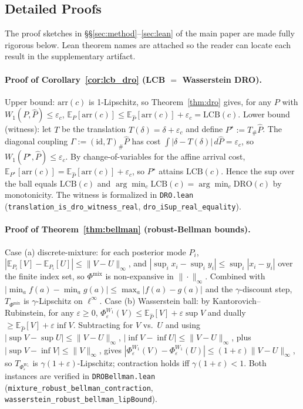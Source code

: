 \documentclass[opre,dblanonrev]{informs4}
\begin{document}
\begin{APPENDICES}
\section{Detailed Proofs}
\label{ec:detailed_proofs}

The proof sketches in \S\S\ref{sec:method}--\ref{sec:lean} of the
main paper are made fully rigorous below. Lean theorem names are
attached so the reader can locate each result in the supplementary
artifact.

\paragraph{Proof of Corollary~\ref{cor:lcb_dro} (LCB $=$ Wasserstein DRO).}
Upper bound: $\mathrm{arr}(c)$ is 1-Lipschitz, so
Theorem~\ref{thm:dro} gives, for any $P$ with
$W_1(P,\hat P)\leq\varepsilon_c$,
$\mathbb{E}_P[\mathrm{arr}(c)]\leq\mathbb{E}_{\hat P}[\mathrm{arr}(c)]
+\varepsilon_c=\mathrm{LCB}(c)$. Lower bound (witness): let $T$ be
the translation $T(\delta)=\delta+\varepsilon_c$ and define
$P^\star := T_\#\hat P$. The diagonal coupling
$\Gamma:=(\mathrm{id},T)_\#\hat P$ has cost
$\int|\delta-T(\delta)|\,d\hat P=\varepsilon_c$, so
$W_1(P^\star,\hat P)\leq\varepsilon_c$. By change-of-variables for
the affine arrival cost,
$\mathbb{E}_{P^\star}[\mathrm{arr}(c)]=\mathbb{E}_{\hat P}
[\mathrm{arr}(c)]+\varepsilon_c$, so $P^\star$ attains
$\mathrm{LCB}(c)$. Hence the sup over the ball equals
$\mathrm{LCB}(c)$ and $\arg\min_c\mathrm{LCB}(c)
=\arg\min_c\mathrm{DRO}(c)$ by monotonicity. The witness is
formalized in \texttt{DRO.lean}
(\texttt{translation\_is\_dro\_witness\_real},
\texttt{dro\_iSup\_real\_equality}).

\paragraph{Proof of Theorem~\ref{thm:bellman} (robust-Bellman bounds).}
Case (a) discrete-mixture: for each posterior mode $P_i$,
$|\mathbb{E}_{P_i}[V]-\mathbb{E}_{P_i}[U]|\leq\|V-U\|_\infty$, and
$|\sup_i x_i-\sup_i y_i|\leq\sup_i|x_i-y_i|$ over the finite index
set, so $\Phi^{\mathrm{mix}}$ is non-expansive in
$\|\cdot\|_\infty$. Combined with
$|\min_a f(a)-\min_a g(a)|\leq\max_a|f(a)-g(a)|$ and the
$\gamma$-discount step, $T_{\Phi^{\mathrm{mix}}}$ is $\gamma$-Lipschitz
on $\ell^\infty$. Case (b) Wasserstein ball: by
Kantorovich--Rubinstein, for any
$\varepsilon\geq 0$, $\Phi^{W_1}_\varepsilon(V)\leq
\mathbb{E}_{\hat P}[V]+\varepsilon\sup V$ and dually
$\geq\mathbb{E}_{\hat P}[V]+\varepsilon\inf V$. Subtracting for
$V$ vs.\ $U$ and using $|\sup V-\sup U|\leq\|V-U\|_\infty$,
$|\inf V-\inf U|\leq\|V-U\|_\infty$, plus
$|\sup V-\inf V|\leq\|V\|_\infty$, gives
$|\Phi^{W_1}_\varepsilon(V)-\Phi^{W_1}_\varepsilon(U)|\leq
(1+\varepsilon)\|V-U\|_\infty$, so
$T_{\Phi^{W_1}_\varepsilon}$ is $\gamma(1+\varepsilon)$-Lipschitz;
contraction holds iff $\gamma(1+\varepsilon)<1$. Both instances are
verified in \texttt{DROBellman.lean}
(\texttt{mixture\_robust\_bellman\_contraction},
\texttt{wasserstein\_robust\_bellman\_lipBound}).


\end{APPENDICES}
\end{document}
